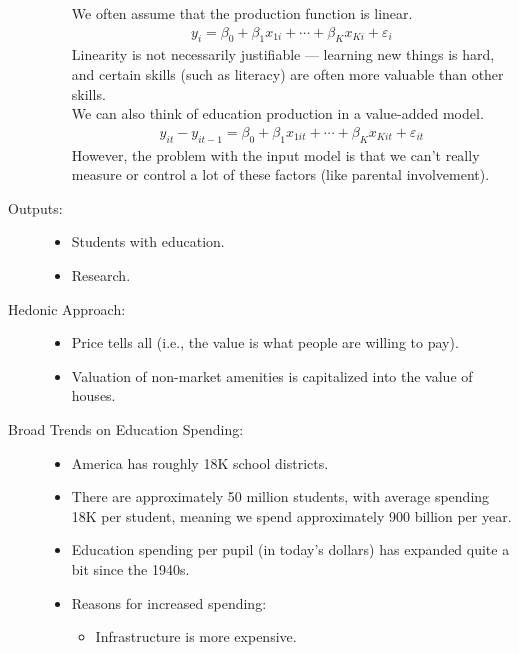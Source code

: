 \documentclass[10pt]{extarticle}
\begin{document}
\begin{description}
\begin{itemize}
          We often assume that the production function is linear.
          \begin{align*}
            y_i = \beta_0 + \beta_1x_{1i} + \cdots + \beta_Kx_{Ki} + \varepsilon_i
          \end{align*}
          Linearity is not necessarily justifiable --- learning new things is hard, and certain skills (such as literacy) are often more valuable than other skills.\\

          We can also think of education production in a value-added model.
          \begin{align*}
            y_{it} - y_{it-1} = \beta_0 + \beta_1x_{1it} + \cdots + \beta_Kx_{Kit} + \varepsilon_{it}
          \end{align*}
          However, the problem with the input model is that we can't really measure or control a lot of these factors (like parental involvement).
      \end{itemize}
    \item[Outputs:]\hfill
      \begin{itemize}
        \item Students with education.
        \item Research.
      \end{itemize}
    \item[Hedonic Approach:]\hfill
      \begin{itemize}
        \item Price tells all (i.e., the value is what people are willing to pay).
        \item Valuation of non-market amenities is capitalized into the value of houses.
      \end{itemize}
    \item[Broad Trends on Education Spending:]\hfill
      \begin{itemize}
        \item America has roughly 18K school districts.
        \item There are approximately 50 million students, with average spending 18K per student, meaning we spend approximately 900 billion per year. 
        \item Education spending per pupil (in today's dollars) has expanded quite a bit since the 1940s.
        \item Reasons for increased spending:
          \begin{itemize}
            \item Infrastructure is more expensive.

\end{itemize}
\end{itemize}
\end{description}
\end{document}
